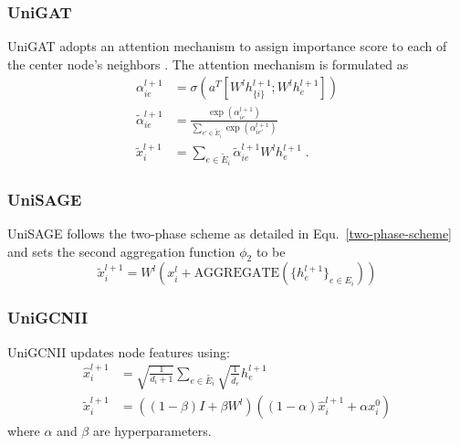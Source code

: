 \subsubsection{UniGAT} UniGAT adopts an attention mechanism to assign importance score to each of the center node’s neighbors \citep{huang2021unignn}. The attention mechanism is formulated as
\begin{align}
\alpha_{ie}^{l+1} &= \sigma \left( a^T \left[ W^l h_{\{i\}}^{l+1} ; W^l h_e^{l+1} \right] \right) \\
\tilde{\alpha}_{ie}^{l+1} & = \frac{\exp (\alpha_{ie}^{l+1})}{\sum_{e' \in \tilde{E}_i} \exp (\alpha_{ie'}^{l+1})} \\
\tilde{x}_i^{l+1} & = \sum_{e \in \tilde{E}_i} \tilde{\alpha}_{ie}^{l+1} W^l h_e^{l+1} \; .
\end{align}

\subsubsection{UniSAGE}
UniSAGE follows the two-phase scheme as detailed in Equ.~\ref{two-phase-scheme} and sets the second aggregation function $\phi_2$ to be
\begin{equation} \tilde{x}_i^{l+1} = W^l(x_i^l + \text{AGGREGATE} (\{h_e^{l+1}\}_{e\in E_i}
)) \end{equation}

\subsubsection{UniGCNII}
UniGCNII updates node features using:
\begin{align} \hat{x}_i^{l+1} & = \sqrt{\frac{1}{d_i+1}} \sum_{e \in \tilde{E_i}} \sqrt{\frac{1}{\overline{d}_e}} h_e^{l+1} \\
     \tilde{x}_i^{l+1} & = \left((1 - \beta)I + \beta W^l\right)\left((1 - \alpha)\hat{x}_i^{l+1} + \alpha x^0_i\right) \end{align} 
     where $\alpha$ and $\beta$  are hyperparameters.
